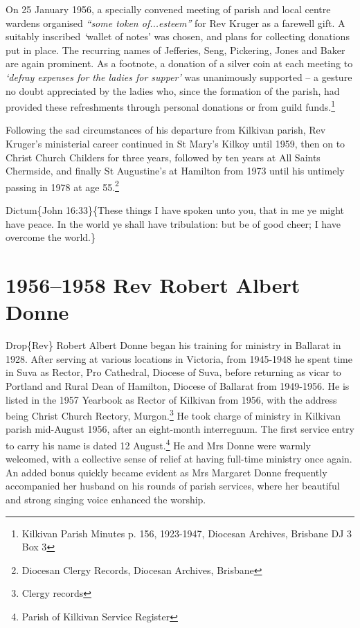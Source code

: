 On 25 January 1956, a specially convened meeting of parish and local centre wardens organised \emph{``some token of...esteem''} for Rev Kruger as a farewell gift. A suitably inscribed \emph{`}wallet of notes' was chosen, and plans for collecting donations put in place. The recurring names of Jefferies, Seng, Pickering, Jones and Baker are again prominent. As a footnote, a donation of a silver coin at each meeting to \emph{`defray expenses for the ladies for supper'} was unanimously supported -- a gesture no doubt appreciated by the ladies who, since the formation of the parish, had provided these refreshments through personal donations or from guild funds.\footnote{Kilkivan Parish Minutes p. 156, 1923-1947, Diocesan Archives, Brisbane DJ 3 Box 3}

Following the sad circumstances of his departure from Kilkivan parish, Rev Kruger's ministerial career continued in St Mary's Kilkoy until 1959, then on to Christ Church Childers for three years, followed by ten years at All Saints Chermside, and finally St Augustine's at Hamilton from 1973 until his untimely passing in 1978 at age 55.\footnote{Diocesan Clergy Records, Diocesan Archives, Brisbane}

Dictum\{John 16:33\}\{These things I have spoken unto you, that in me ye might have peace. In the world ye shall have tribulation: but be of good cheer; I have overcome the world.\}

\hypertarget{rev-robert-albert-donne}{%
\chapter{1956--1958 Rev Robert Albert Donne}\label{rev-robert-albert-donne}}

Drop\{Rev\} Robert Albert Donne began his training for ministry in Ballarat in 1928. After serving at various locations in Victoria, from 1945-1948 he spent time in Suva as Rector, Pro Cathedral, Diocese of Suva, before returning as vicar to Portland and Rural Dean of Hamilton, Diocese of Ballarat from 1949-1956. He is listed in the 1957 Yearbook as Rector of Kilkivan from 1956, with the address being Christ Church Rectory, Murgon.\footnote{Clergy records} He took charge of ministry in Kilkivan parish mid-August 1956, after an eight-month interregnum. The first service entry to carry his name is dated 12 August.\footnote{Parish of Kilkivan Service Register} He and Mrs Donne were warmly welcomed, with a collective sense of relief at having full-time ministry once again. An added bonus quickly became evident as Mrs Margaret Donne frequently accompanied her husband on his rounds of parish services, where her beautiful and strong singing voice enhanced the worship.

